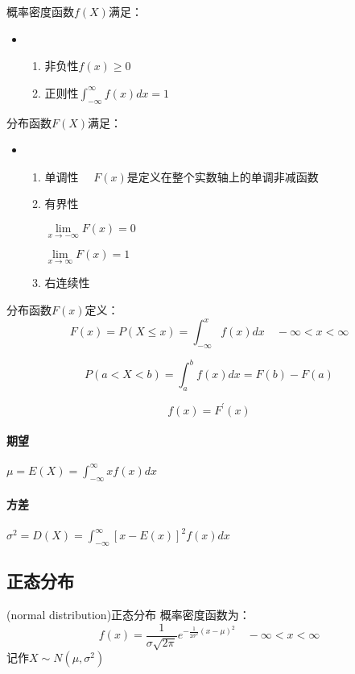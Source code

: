 \documentclass[UTF8,10pt]{book}
\begin{document}
                概率密度函数$f(X)$满足：
                \begin{itemize}
                    \item [] {
                        \begin{enumerate}
                            \item 非负性$ f(x) \ge 0 $
                            \item 正则性$ \int_{-\infty}^\infty f(x) dx = 1 $
                        \end{enumerate}
                    }
                \end{itemize}
				
				分布函数$F(X)$满足：
				\begin{itemize}
					\item [] {
						\begin{enumerate}
							\item 单调性 $\quad F(x)$是定义在整个实数轴上的单调非减函数
							\item 有界性 
							
							$\lim\limits_{x \to -\infty} F(x) = 0$
							
							$\lim\limits_{x \to \infty} F(x) = 1$
							\item 右连续性
						\end{enumerate}
					}
				\end{itemize}
			
                分布函数$F(x)$定义：
                $$F(x) = P(X\le x) = \int_{-\infty}^x f(x) dx \quad  -\infty <x<\infty$$

                $$ P(a<X<b) =  \int_{a}^b f(x) dx = F(b) -F(a) $$

                $$ f(x) = F^{'}(x) $$

                \paragraph{期望} $ \mu=E(X) = \int_{-\infty}^\infty xf(x) dx $
                \paragraph{方差} $ \sigma^2 = D(X) = \int_{-\infty}^\infty [x-E(x)]^2 f(x) dx $

            \subsection{正态分布} 
                (normal distribution)正态分布
                概率密度函数为：
                $$ f(x) = \frac{1}{\sigma \sqrt{2\pi}} e^{-\frac{1}{2\sigma^2} (x-\mu)^2}
                \quad
                -\infty < x < \infty
                $$
                记作$X\sim N(\mu,\sigma^2) $
\end{document}

